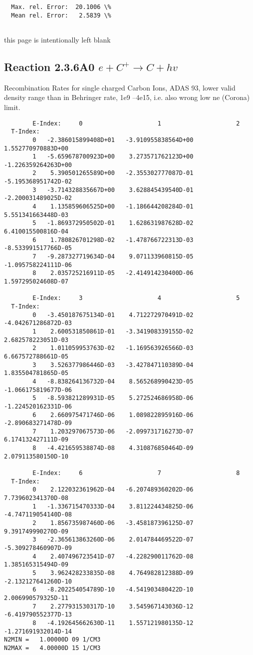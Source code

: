 \documentclass[12pt,dvipdfmx]{article}
\begin{document}
{\begin{small}
\begin{verbatim}
  Max. rel. Error:  20.1006 \%
  Mean rel. Error:   2.5839 \%


\end{verbatim}\end{small}
\newpage
this page is intentionally left blank
\newpage

\subsection{
Reaction 2.3.6A0  $e + C^{+} \rightarrow C + hv$
}
 Recombination Rates for single
 charged Carbon Ions, ADAS 93,
 lower valid density range than in Behringer rate, 1e9 --4e15,
 i.e. also wrong low ne (Corona) limit.

\begin{small}\begin{verbatim}
        E-Index:     0                     1                     2
  T-Index:
        0   -2.386015899408D+01   -3.910955838564D+00    1.552770970883D+00
        1   -5.659678700923D+00    3.273571762123D+00   -1.226359264263D+00
        2    5.390501265589D+00   -2.355302777087D-01   -5.195368951742D-02
        3   -3.714328835667D+00    3.628845439540D-01   -2.200031489025D-02
        4    1.135859606525D+00   -1.186644208284D-01    5.551341663448D-03
        5   -1.869372950502D-01    1.628631987628D-02    6.410015500816D-04
        6    1.780826701298D-02   -1.478766722313D-03   -8.533991517766D-05
        7   -9.287327719634D-04    9.071133960815D-05   -1.095758224111D-06
        8    2.035725216911D-05   -2.414914230400D-06    1.597295024608D-07

        E-Index:     3                     4                     5
  T-Index:
        0   -3.450187675134D-01    4.712272970491D-02   -4.042671286872D-03
        1    2.600531850861D-01   -3.341908339155D-02    2.682578223051D-03
        2    1.011059953763D-02   -1.169563926566D-03    6.667572788661D-05
        3    3.526377986446D-03   -3.427847110389D-04    1.835504781865D-05
        4   -8.838264136732D-04    8.565268990423D-05   -1.066175819677D-06
        5   -8.593821289931D-05    5.272524686958D-06   -1.224520162331D-06
        6    2.660975471746D-06    1.089822895916D-06   -2.890683271478D-09
        7    1.203297067573D-06   -2.099731716273D-07    6.174132427111D-09
        8   -4.421659538874D-08    4.310876850464D-09    2.079113580150D-10

        E-Index:     6                     7                     8
  T-Index:
        0    2.122032361962D-04   -6.207489360202D-06    7.739602341370D-08
        1   -1.336715470333D-04    3.811224434825D-06   -4.747119054140D-08
        2    1.856735987460D-06   -3.458187396125D-07    9.391749990270D-09
        3   -2.365613863260D-06    2.014784469522D-07   -5.309278460907D-09
        4    2.407496723541D-07   -4.228290011762D-08    1.385165315494D-09
        5    3.962428233835D-08    4.764982812388D-09   -2.132127641260D-10
        6   -8.202254054789D-10   -4.541903480422D-10    2.006990579325D-11
        7    2.277931530317D-10    3.545967143036D-12   -6.419790552377D-13
        8   -4.192645662630D-11    1.557121980135D-12   -1.271691932014D-14
N2MIN =   1.00000D 09 1/CM3
N2MAX =   4.00000D 15 1/CM3


\end{verbatim}
\end{small}}
\end{document}
